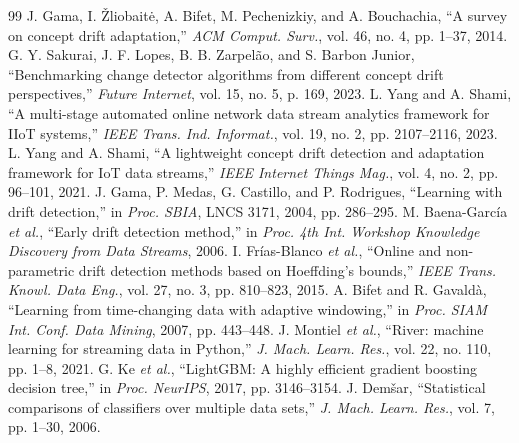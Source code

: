 \documentclass[conference]{IEEEtran}
\begin{document}
\begin{thebibliography}{99}
 J. Gama, I. \v{Z}liobait\.{e}, A. Bifet, M. Pechenizkiy, and A. Bouchachia, ``A survey on concept drift adaptation,'' \emph{ACM Comput. Surv.}, vol. 46, no. 4, pp. 1--37, 2014.
 G. Y. Sakurai, J. F. Lopes, B. B. Zarpel\~ao, and S. Barbon Junior, ``Benchmarking change detector algorithms from different concept drift perspectives,'' \emph{Future Internet}, vol. 15, no. 5, p. 169, 2023.
 L. Yang and A. Shami, ``A multi-stage automated online network data stream analytics framework for IIoT systems,'' \emph{IEEE Trans. Ind. Informat.}, vol. 19, no. 2, pp. 2107--2116, 2023.
 L. Yang and A. Shami, ``A lightweight concept drift detection and adaptation framework for IoT data streams,'' \emph{IEEE Internet Things Mag.}, vol. 4, no. 2, pp. 96--101, 2021.
 J. Gama, P. Medas, G. Castillo, and P. Rodrigues, ``Learning with drift detection,'' in \emph{Proc. SBIA}, LNCS 3171, 2004, pp. 286--295.
 M. Baena-Garc\'ia \emph{et al.}, ``Early drift detection method,'' in \emph{Proc. 4th Int. Workshop Knowledge Discovery from Data Streams}, 2006.
 I. Fr\'ias-Blanco \emph{et al.}, ``Online and non-parametric drift detection methods based on Hoeffding's bounds,'' \emph{IEEE Trans. Knowl. Data Eng.}, vol. 27, no. 3, pp. 810--823, 2015.
 A. Bifet and R. Gavald\`a, ``Learning from time-changing data with adaptive windowing,'' in \emph{Proc. SIAM Int. Conf. Data Mining}, 2007, pp. 443--448.
 J. Montiel \emph{et al.}, ``River: machine learning for streaming data in Python,'' \emph{J. Mach. Learn. Res.}, vol. 22, no. 110, pp. 1--8, 2021.
 G. Ke \emph{et al.}, ``LightGBM: A highly efficient gradient boosting decision tree,'' in \emph{Proc. NeurIPS}, 2017, pp. 3146--3154.
 J. Dem\v{s}ar, ``Statistical comparisons of classifiers over multiple data sets,'' \emph{J. Mach. Learn. Res.}, vol. 7, pp. 1--30, 2006.
\end{thebibliography}
\end{document}
